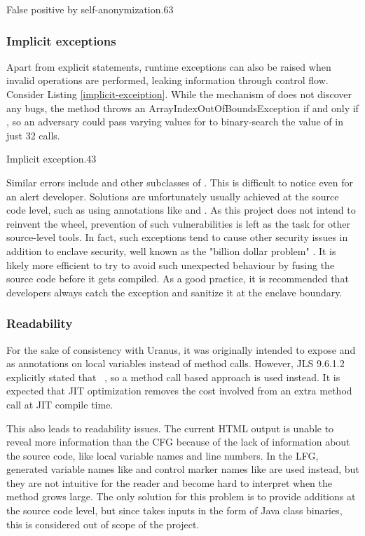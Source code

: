 {False positive by self-anonymization}{.6}{3}

\subsubsection{Implicit exceptions}
Apart from explicit  statements,
runtime exceptions can also be raised when invalid operations are performed,
leaking information through control flow.
Consider Listing \ref{implicit-exceiption}.
While the mechanism of \pname{} does not discover any bugs,
the method throws an ArrayIndexOutOfBoundsException
if and only if ,
so an adversary could pass varying values for 
to binary-search the value of  in just 32 calls.

{Implicit exception}{.4}{3}

Similar errors include 
and other subclasses of .
This is difficult to notice even for an alert developer.
Solutions are unfortunately usually achieved at the source code level,
such as using annotations like  and .
As this project does not intend to reinvent the wheel,
prevention of such vulnerabilities is left as the task for other source-level tools.
In fact, such exceptions tend to cause other security issues in addition to enclave security,
well known as the "billion dollar problem" \cite{nullbillion}.
It is likely more efficient to try to avoid such unexpected behaviour
by fusing the source code before it gets compiled.
As a good practice, it is recommended that
developers always catch the exception
and sanitize it at the enclave boundary.

\subsubsection{Readability}
For the sake of consistency with Uranus,
it was originally intended to expose  and 
as annotations on local variables instead of method calls.
However, \ac{JLS} 9.6.1.2 explicitly stated that
~\cite{jls},
so a method call based approach is used instead.
It is expected that \ac{JIT} optimization removes the cost
involved from an extra method call at \ac{JIT} compile time.

This also leads to readability issues.
The current HTML output is unable to reveal more information than the \ac{CFG}
because of the lack of information about the source code,
like local variable names and line numbers.
In the \ac{LFG}, generated variable names like 
and control marker names like  are used instead,
but they are not intuitive for the reader
and become hard to interpret when the method grows large.
The only solution for this problem is to provide additions at the source code level,
but since \pname{} takes inputs in the form of Java class binaries,
this is considered out of scope of the project.

